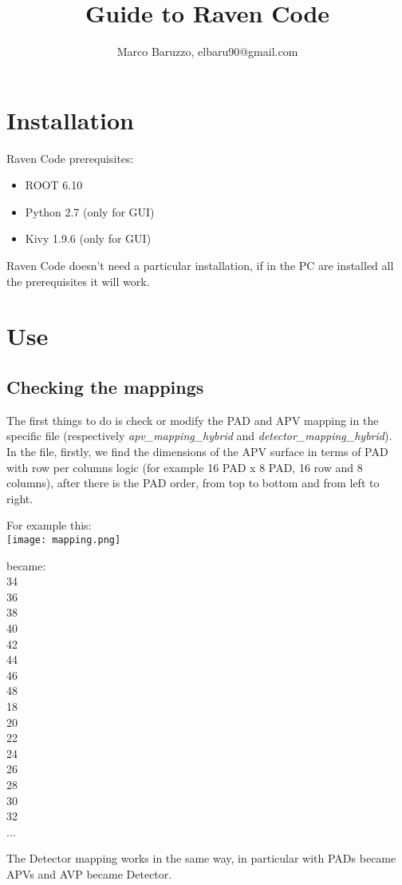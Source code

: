 \documentclass[a4paper,12pt]{article}
\title{Guide to Raven Code}
\author{Marco Baruzzo, elbaru90@gmail.com}
\begin{document}
	\maketitle

	\titlepage

	\tableofcontents
	\newpage

	\section{Installation}
		Raven Code prerequisites:
		\begin{itemize}
			\item ROOT 6.10
			\item Python 2.7 (only for GUI)
			\item Kivy 1.9.6 (only for GUI)
		\end{itemize}
		Raven Code doesn't need a particular installation, if in the PC are installed all the prerequisites it will work.

	\section{Use}
		\subsection{Checking the mappings}
			The first things to do is check or modify the PAD and APV mapping in the specific file (respectively \textit{apv\_mapping\_hybrid} and \textit{detector\_mapping\_hybrid}).\\ 
			In the file, firstly, we find the dimensions of the APV surface in terms of PAD with row per columns logic (for example 16 PAD x 8 PAD, 16 row and 8 columns), after there is the PAD order, from top to bottom and from left to right.\\
			\begin{minipage}[c]{0.49\textwidth}
				For example this:\\
				\centering
				\texttt{[image: mapping.png]}
			\end{minipage}
			\begin{minipage}[c]{0.49\textwidth}
				\centering
				became:\\
				34\\
				36\\
				38\\
				40\\
				42\\
				44\\
				46\\
				48\\
				18\\
				20\\
				22\\
				24\\
				26\\
				28\\
				30\\
				32\\
				...\\
			\end{minipage}
			The Detector mapping works in the same way, in particular with PADs became APVs and AVP became Detector.
\end{document}
